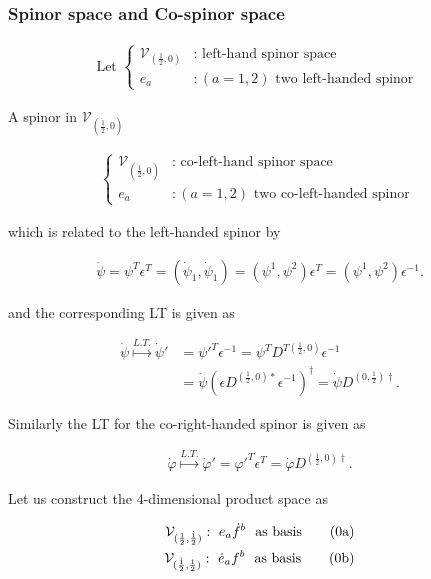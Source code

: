 \documentclass[12pt]{beamer}
\newcommand{\stag}[1]{\tag{\arabic{equation}#1}}
\begin{document}
\begin{frame}
\frametitle{Spinor space and Co-spinor space}

\begin{align}
\mbox{Let }\left\{\begin{array}{ll}\mathcal{V}_{(\frac{1}{2},0)}&:\mbox{ left-hand spinor space }\\
e_{a}&: (a=1, 2) \mbox{ two left-handed spinor }\end{array}\right.
\end{align}

A spinor in $ \mathcal{V}_{(\dot{\frac{1}{2}},0)} $

\begin{align}
\left\{\begin{array}{ll}\mathcal{V}_{(\dot{\frac{1}{2}},0)}&:\mbox{ co-left-hand spinor space }\\
e_{\dot{a}}&: (a=1, 2) \mbox{ two co-left-handed spinor }\end{array}\right.
\end{align}

\noindent which is related to the left-handed spinor by

\begin{align}
\dot{\psi}=\psi^T\epsilon^T=(\dot{\psi}_1,\dot{\psi}_1)=(\psi^1,\psi^2)\epsilon^T=(\psi^1,\psi^2)\epsilon^{-1}.
\end{align}

\end{frame}

\begin{frame}
\noindent and the corresponding LT is given as

\begin{align}
\dot{\psi}\stackrel{L.T.}{\longmapsto}\dot{\psi}'&=\psi'^T\epsilon^{-1}=
\psi^TD^{T(\frac{1}{2},0)}\epsilon^{-1}\\
&=\dot{\psi}(\epsilon D^{(\frac{1}{2},0)*}\epsilon^{-1})^{\dag}= \dot{\psi}D^{(0,\frac{1}{2})\dag}.
\end{align}

Similarly the LT for the co-right-handed spinor is given as

\begin{align}
\dot{\varphi}\stackrel{L.T.}{\longmapsto}\dot{\varphi}'=\varphi'^T\epsilon^T=
\dot{\varphi}D^{(\frac{1}{2},0)\dag}.
\end{align}

Let us construct the 4-dimensional product space as

\addtocounter{equation}{+1}
\begin{align*}
\mathcal{V}_{(\frac{1}{2},\dot{\frac{1}{2}})}:~e_a\dot{f}^b~~\mbox{as basis}\stag{a}\\
\mathcal{V}_{(\dot{\frac{1}{2}},\frac{1}{2})}:~\dot{e}_af^b~~\mbox{as basis}\stag{b}
\end{align*}

\end{frame}
\end{document}

